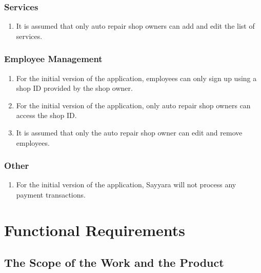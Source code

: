 \documentclass[12pt]{article}
\begin{document}
\subsubsection{Services}
\begin{enumerate}
	\item It is assumed that only auto repair shop owners can add and edit the list of services.
\end{enumerate}

\subsubsection{Employee Management}
\begin{enumerate}
	\item For the initial version of the application, employees can only sign up using a shop ID provided by
	      the shop owner.
	\item For the initial version of the application, only auto repair shop owners can access the shop ID.
	\item It is assumed that only the auto repair shop owner can edit and remove employees.
\end{enumerate}

\subsubsection{Other}
\begin{enumerate}
	\item For the initial version of the application, Sayyara will not process any payment transactions.
\end{enumerate}

\section{Functional Requirements}

\subsection{The Scope of the Work and the Product}
\end{document}
